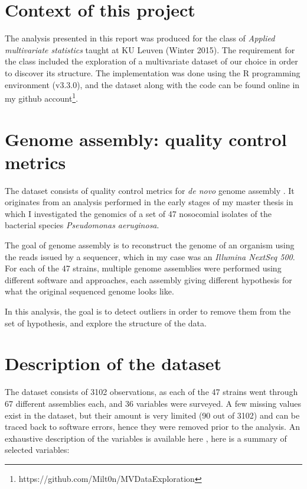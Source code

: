 \documentclass[11pt, a4paper,titlepage]{article}
\begin{document}


\section{Context of this project}

The analysis presented in this report was produced for the class of
\emph{Applied multivariate statistics} taught at KU Leuven (Winter
2015). The requirement for the class included the exploration of a
multivariate dataset of our choice in order to discover its
structure. The implementation was done using the R programming
environment (v3.3.0), and the dataset along with the code can be found
online in my github
account\footnote{https://github.com/Milt0n/MVDataExploration}.

\section{Genome assembly: quality control metrics}

The dataset consists of quality control metrics for \emph{de novo}
genome assembly \cite{baker2012novo}. It originates from an analysis
performed in the early stages of my master thesis in which I
investigated the genomics of a set of 47 nosocomial isolates of the
bacterial species \emph{Pseudomonas aeruginosa}.

The goal of genome assembly is to reconstruct the genome of an
organism using the reads issued by a sequencer, which in my case was
an \emph{Illumina NextSeq 500}. For each of the 47 strains, multiple
genome assemblies were performed using different software and
approaches, each assembly giving different hypothesis for what the
original sequenced genome looks like.

In this analysis, the goal is to detect outliers in order to remove
them from the set of hypothesis, and explore the structure of the
data.

\section{Description of the dataset}

The dataset consists of 3102 observations, as each of the 47 strains
went through 67 different assemblies each, and 36 variables were
surveyed. A few missing values exist in the dataset, but their amount
is very limited (90 out of 3102) and can be traced back to software
errors, hence they were removed prior to the analysis. An exhaustive
description of the variables is available here
\cite{gurevich2013quast}, here is a summary of selected variables:
\end{document}
